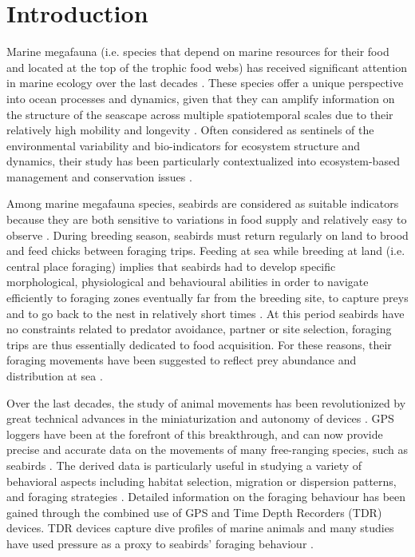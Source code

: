 \documentclass{article}
\begin{document}

\newpage


\section{Introduction}
Marine megafauna (i.e. species that depend on marine resources for their food and located at the top of the trophic food webs) has received significant attention in marine ecology over the last decades \citep{authier_conservation_2017}.
These species offer a unique perspective into ocean processes and dynamics, given that they can  amplify  information on the structure of the seascape across multiple spatiotemporal scales due to their relatively high mobility and longevity \citep{hazen_marine_2019}.
Often considered as sentinels of the environmental variability and bio-indicators for ecosystem structure and dynamics, their study has been particularly contextualized into ecosystem-based management and conservation issues \citep{lascelles_migratory_2014, hooker_marine_2004}.

Among marine megafauna species, seabirds are considered as suitable indicators because they are both sensitive to variations in food supply and relatively easy to observe \citep{furness_seabirds_1997, wakefield_quantifying_2009}.
During breeding season, seabirds must return regularly on land to brood and feed chicks between foraging trips.
Feeding at sea while breeding at land (i.e. central place foraging) implies  that seabirds had to develop specific morphological, physiological and behavioural abilities in order to navigate efficiently to foraging zones eventually far from the breeding site, to capture preys and to go back to the nest in relatively short times \citep{schreiber_biology_2001}.
At this period seabirds have no constraints related to predator avoidance, partner or site selection, foraging trips are thus essentially dedicated to food acquisition. For these reasons, their foraging movements have been suggested to reflect prey abundance and distribution at sea \citep{weimerskirch_are_2007}.

Over the last decades, the study of animal movements has been revolutionized by great technical advances in the miniaturization and autonomy of devices \citep{ropert-coudert_diving_2009}.
GPS loggers have been at the forefront of this breakthrough, and can now provide precise and accurate data on the movements of many free-ranging species, such as seabirds \citep{wakefield_quantifying_2009,yoda_advances_2019}.
The derived data is particularly useful in studying a variety of behavioral aspects including habitat selection, migration or dispersion patterns, and foraging
strategies \citep{nathan_movement_2008}.
Detailed information on the foraging behaviour has been gained through the combined use of GPS and Time Depth Recorders (TDR) devices.
TDR devices capture dive profiles of marine animals and many studies have used pressure as a proxy to seabirds' foraging behaviour \citep{cox_seabird_2016,shoji_foraging_2015}.
\end{document}

